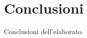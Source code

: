 \documentclass[%
    corpo=12pt,
    twoside,
    oldstyle,
    autoretitolo,
    greek,
    evenboxes,
]{toptesi}
\begin{document}

\chapter{Conclusioni}
Conclusioni dell'elaborato.




\end{document}
